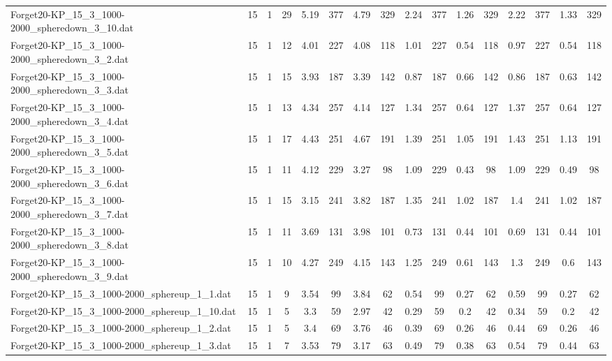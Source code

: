 \begin{sidewaystable}[!ht]
{\begin{tabular}{lccccccccccccccc}
Forget20-KP\_15\_3\_1000-2000\_spheredown\_3\_10.dat & 15 & 1 & 29 & 5.19 & 377 & 4.79 & 329 & 2.24 & 377 & 1.26 & 329 & 2.22 & 377 & 1.33 & 329 \\
Forget20-KP\_15\_3\_1000-2000\_spheredown\_3\_2.dat & 15 & 1 & 12 & 4.01 & 227 & 4.08 & 118 & 1.01 & 227 &  \textcolor{blue2}{0.54} & 118 & 0.97 & 227 &  \textcolor{blue2}{0.54} & 118 \\
Forget20-KP\_15\_3\_1000-2000\_spheredown\_3\_3.dat & 15 & 1 & 15 & 3.93 & 187 & 3.39 & 142 & 0.87 & 187 & 0.66 & 142 & 0.86 & 187 &  \textcolor{blue2}{0.63} & 142 \\
Forget20-KP\_15\_3\_1000-2000\_spheredown\_3\_4.dat & 15 & 1 & 13 & 4.34 & 257 & 4.14 & 127 & 1.34 & 257 & 0.64 & 127 & 1.37 & 257 & 0.64 & 127 \\
Forget20-KP\_15\_3\_1000-2000\_spheredown\_3\_5.dat & 15 & 1 & 17 & 4.43 & 251 & 4.67 & 191 & 1.39 & 251 &  \textcolor{blue2}{1.05} & 191 & 1.43 & 251 & 1.13 & 191 \\
Forget20-KP\_15\_3\_1000-2000\_spheredown\_3\_6.dat & 15 & 1 & 11 & 4.12 & 229 & 3.27 & 98 & 1.09 & 229 &  \textcolor{blue2}{0.43} & 98 & 1.09 & 229 & 0.49 & 98 \\
Forget20-KP\_15\_3\_1000-2000\_spheredown\_3\_7.dat & 15 & 1 & 15 & 3.15 & 241 & 3.82 & 187 & 1.35 & 241 & 1.02 & 187 & 1.4 & 241 & 1.02 & 187 \\
Forget20-KP\_15\_3\_1000-2000\_spheredown\_3\_8.dat & 15 & 1 & 11 & 3.69 & 131 & 3.98 & 101 & 0.73 & 131 & 0.44 & 101 & 0.69 & 131 & 0.44 & 101 \\
Forget20-KP\_15\_3\_1000-2000\_spheredown\_3\_9.dat & 15 & 1 & 10 & 4.27 & 249 & 4.15 & 143 & 1.25 & 249 & 0.61 & 143 & 1.3 & 249 &  \textcolor{blue2}{0.6} & 143 \\
Forget20-KP\_15\_3\_1000-2000\_sphereup\_1\_1.dat & 15 & 1 & 9 & 3.54 & 99 & 3.84 & 62 & 0.54 & 99 &  \textcolor{blue2}{0.27} & 62 & 0.59 & 99 &  \textcolor{blue2}{0.27} & 62 \\
Forget20-KP\_15\_3\_1000-2000\_sphereup\_1\_10.dat & 15 & 1 & 5 & 3.3 & 59 & 2.97 & 42 & 0.29 & 59 &  \textcolor{blue2}{0.2} & 42 & 0.34 & 59 &  \textcolor{blue2}{0.2} & 42 \\
Forget20-KP\_15\_3\_1000-2000\_sphereup\_1\_2.dat & 15 & 1 & 5 & 3.4 & 69 & 3.76 & 46 & 0.39 & 69 &  \textcolor{blue2}{0.26} & 46 & 0.44 & 69 &  \textcolor{blue2}{0.26} & 46 \\
Forget20-KP\_15\_3\_1000-2000\_sphereup\_1\_3.dat & 15 & 1 & 7 & 3.53 & 79 & 3.17 & 63 & 0.49 & 79 & 0.38 & 63 & 0.54 & 79 & 0.44 & 63 \\

\end{tabular}}
\end{sidewaystable}
